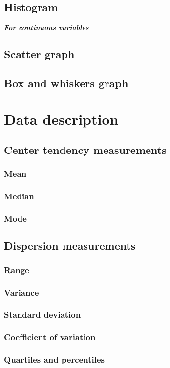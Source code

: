 \documentclass{report}
\newcommand{\notefor}[1]{\hfill\textbf{\textit{#1}}}
\begin{document}
	\section{Histogram}
	\notefor{For continuous variables}
	
	\section{Scatter graph}
	\section{Box and whiskers graph}
	
\chapter{Data description}
	\section{Center tendency measurements}
		\subsection{Mean}
		\subsection{Median}
		\subsection{Mode}
	\section{Dispersion measurements}
		\subsection{Range}
		\subsection{Variance}
		\subsection{Standard deviation}
		\subsection{Coefficient of variation}
		\subsection{Quartiles and percentiles}
\end{document}
